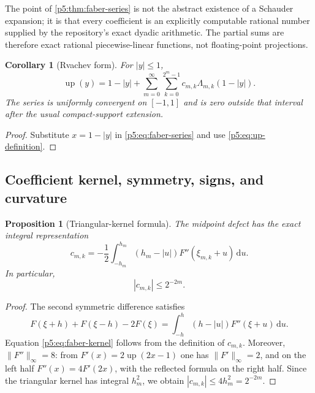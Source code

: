 \documentclass[11pt,oneside]{article}
\newtheorem{proposition}[theorem]{Proposition}
\newtheorem{corollary}[theorem]{Corollary}
\theoremstyle{definition}
\newcommand{\dd}{\,\mathrm d}
\newcommand{\Up}{\operatorname{up}}
\begin{document}
\newresult The point of \cref{p5:thm:faber-series} is not the abstract existence
of a Schauder expansion; it is that every coefficient is an explicitly
computable rational number supplied by the repository's exact dyadic
arithmetic.  The partial sums are therefore exact rational piecewise-linear
functions, not floating-point projections.

\begin{corollary}[Rvachev form]
\label{p5:cor:up-faber}
For $|y|\le1$,
\begin{equation}
 \boxed{\displaystyle
 \Up(y)=1-|y|+
 \sum_{m=0}^\infty\sum_{k=0}^{2^m-1}
 c_{m,k}\Lambda_{m,k}(1-|y|).}                           \label{p5:eq:up-faber}
\end{equation}
The series is uniformly convergent on $[-1,1]$ and is zero outside that
interval after the usual compact-support extension.
\end{corollary}

\begin{proof}
Substitute $x=1-|y|$ in \eqref{p5:eq:faber-series} and use
\eqref{p5:eq:up-definition}.
\end{proof}

\subsection{Coefficient kernel, symmetry, signs, and curvature}

\begin{proposition}[Triangular-kernel formula]
\label{p5:prop:faber-kernel}
The midpoint defect has the exact integral representation
\begin{equation}
 \boxed{\displaystyle
 c_{m,k}=-\frac12\int_{-h_m}^{h_m}
 (h_m-|u|)F''(\xi_{m,k}+u)\dd u.}                        \label{p5:eq:faber-kernel}
\end{equation}
In particular,
\begin{equation}
 |c_{m,k}|\le2^{-2m}.                                    \label{p5:eq:faber-bound}
\end{equation}
\end{proposition}

\begin{proof}
The second symmetric difference satisfies
\[
 F(\xi+h)+F(\xi-h)-2F(\xi)
 =\int_{-h}^{h}(h-|u|)F''(\xi+u)\dd u.
\]
Equation \eqref{p5:eq:faber-kernel} follows from the definition of $c_{m,k}$.
Moreover, $\|F''\|_\infty=8$: from
$F'(x)=2\Up(2x-1)$ one has $\|F'\|_\infty=2$, and on the
left half $F''(x)=4F'(2x)$, with the reflected formula on the right half.
Since the triangular kernel has integral $h_m^2$, we obtain
$|c_{m,k}|\le4h_m^2=2^{-2m}$.
\end{proof}
\end{document}
